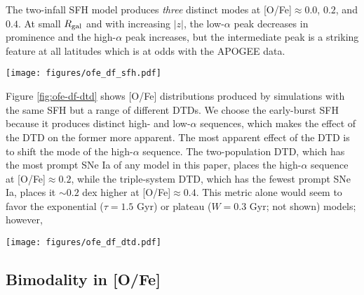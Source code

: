 \documentclass[modern,linenumbers]{aastex631}
\begin{document}
The two-infall SFH model produces \textit{three} distinct modes at [O/Fe]$\approx 0.0$, $0.2$, and $0.4$. At small $R_{\rm gal}$ and with increasing $|z|$, the low-$\alpha$ peak decreases in prominence and the high-$\alpha$ peak increases, but the intermediate peak is a striking feature at all latitudes which is at odds with the APOGEE data.


\begin{figure*}
    \centering
    \texttt{[image: figures/ofe\_df\_sfh.pdf]}
    \caption{Distributions of [O/Fe] from multi-zone simulations with different SFHs. In all cases an exponential DTD with timescale $\tau=1.5$ Gyr is assumed. The format of each panel is the same as in Figure \ref{fig:feh-df-comparison}, except that all distributions are smoothed with a box-car width of 0.05 dex. Distributions from APOGEE DR17, binned and smoothed similarly, are presented in the right-most column for reference.}
    \label{fig:ofe-df-sfh}
\end{figure*}

Figure \ref{fig:ofe-df-dtd} shows [O/Fe] distributions produced by simulations with the same SFH but a range of different DTDs. We choose the early-burst SFH because it produces distinct high- and low-$\alpha$ sequences, which makes the effect of the DTD on the former more apparent. The most apparent effect of the DTD is to shift the mode of the high-$\alpha$ sequence. The two-population DTD, which has the most prompt SNe Ia of any model in this paper, places the high-$\alpha$ sequence at [O/Fe]$\approx 0.2$, while the triple-system DTD, which has the fewest prompt SNe Ia, places it $\sim0.2$ dex higher at [O/Fe]$\approx0.4$. This metric alone would seem to favor the exponential ($\tau=1.5$ Gyr) or plateau ($W=0.3$ Gyr; not shown) models; however, 

\begin{figure*}
    \centering
    \texttt{[image: figures/ofe\_df\_dtd.pdf]}
    \caption{Distributions of [O/Fe] from multi-zone simulations with different DTDs. In all cases an early-burst SFH is assumed. The plot format is similar to Figure \ref{fig:ofe-df-sfh}.}
    \label{fig:ofe-df-dtd}
\end{figure*}

\subsection{Bimodality in [O/Fe]}
\label{sec:bimodality}
\end{document}
